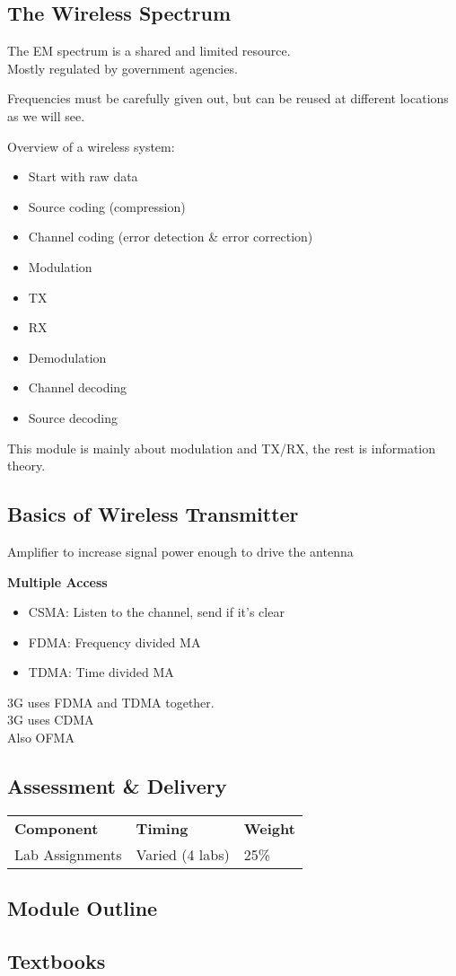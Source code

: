 \documentclass[12pt]{article}
\begin{document}
\subsection{The Wireless Spectrum}
The EM spectrum is a shared and limited resource.\\
Mostly regulated by government agencies.

Frequencies must be carefully given out, but can be reused at different locations as we will see.

Overview of a wireless system:
\begin{itemize} %
\item Start with raw data
\item Source coding (compression)
\item Channel coding (error detection \& error correction)
\item Modulation
\item TX
\item RX
\item Demodulation
\item Channel decoding
\item Source decoding
\end{itemize}

This module is mainly about modulation and TX/RX, the rest is information theory.

\subsection{Basics of Wireless Transmitter}
Amplifier to increase signal power enough to drive the antenna

\textbf{Multiple Access}
\begin{itemize}
\item CSMA: Listen to the channel, send if it's clear
\item FDMA: Frequency divided MA
\item TDMA: Time divided MA
\end{itemize}
3G uses FDMA and TDMA together.\\
3G uses CDMA\\
Also OFMA


\subsection{Assessment \& Delivery}
    \begin{tabular}{ l l l }
        \textbf{Component} & \textbf{Timing} & \textbf{Weight} \\
        Lab Assignments & Varied (4 labs) & 25\% \\

    \end{tabular}
\subsection{Module Outline}
\subsection{Textbooks}
\end{document}

